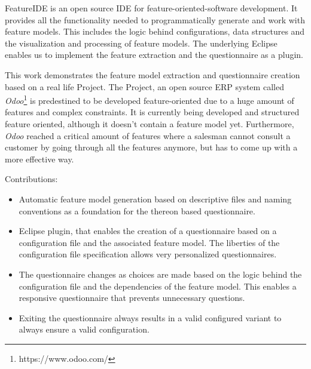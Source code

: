 FeatureIDE is an open source IDE for feature-oriented-software development. It provides all the functionality needed to programmatically generate and work with feature models. This includes the logic behind configurations, data structures and the visualization and processing of feature models. The underlying Eclipse enables us to implement the feature extraction and the questionnaire as a plugin.

This work demonstrates the feature model extraction and questionnaire creation based on a real life Project. The Project, an open source ERP system called \textit{Odoo}\footnote{https://www.odoo.com/} is predestined to be developed feature-oriented due to a huge amount of features and complex constraints. It is currently being developed and structured feature oriented, although it doesn't contain a feature model yet. Furthermore, \textit{Odoo} reached a critical amount of features where a salesman cannot consult a customer by going through all the features anymore, but has to come up with a more effective way.

Contributions:
\begin{itemize}
\item Automatic feature model generation based on descriptive files and naming conventions as a foundation for the thereon based questionnaire.
\item Eclipse plugin, that enables the creation of a questionnaire based on a configuration file and the associated feature model. The liberties of the configuration file specification allows very personalized questionnaires.
\item The questionnaire changes as choices are made based on the logic behind the configuration file and the dependencies of the feature model. This enables a responsive questionnaire that prevents unnecessary questions.
\item Exiting the questionnaire always results in a valid configured variant to always ensure a valid configuration.
\end{itemize}